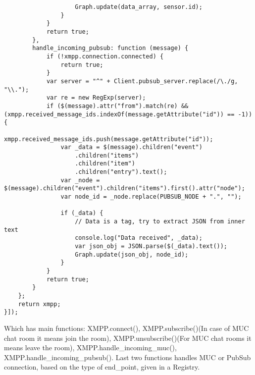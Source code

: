 \begin{lstlisting}
                    Graph.update(data_array, sensor.id);
                }
            }
            return true;
        },
        handle_incoming_pubsub: function (message) {
            if (!xmpp.connection.connected) {
                return true;
            }
            var server = "^" + Client.pubsub_server.replace(/\./g, "\\.");
            var re = new RegExp(server);
            if ($(message).attr("from").match(re) && (xmpp.received_message_ids.indexOf(message.getAttribute("id")) == -1)) {
                xmpp.received_message_ids.push(message.getAttribute("id"));
                var _data = $(message).children("event")
                    .children("items")
                    .children("item")
                    .children("entry").text();
                var _node = $(message).children("event").children("items").first().attr("node");
                var node_id = _node.replace(PUBSUB_NODE + ".", "");

                if (_data) {
                    // Data is a tag, try to extract JSON from inner text
                    console.log("Data received", _data);
                    var json_obj = JSON.parse($(_data).text());
                    Graph.update(json_obj, node_id);
                }
            }
            return true;
        }
    };
    return xmpp;
}]);
\end{lstlisting}
Which has main functions: XMPP.connect(), XMPP.subscribe()(In case of MUC chat room it means join the room), XMPP.unsubscribe()(For MUC chat rooms it means leave the room), XMPP.handle\_incoming\_muc(), XMPP.handle\_incoming\_pubsub(). Last two functions handles MUC or PubSub connection, based on the type of end\_point, given in a Registry.
